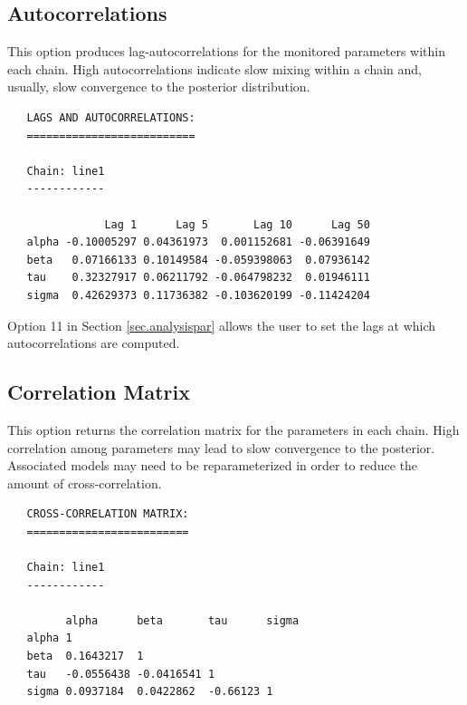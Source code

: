 \documentclass[12pt,letterpaper]{report}
\begin{document}
\subsection{Autocorrelations}
\noindent
This option produces lag-autocorrelations for the monitored parameters within
each chain. High autocorrelations indicate slow mixing within a chain and,
usually, slow convergence to the posterior distribution.
\vskip 9pt
\begin{tiny}
\begin{verbatim}
   LAGS AND AUTOCORRELATIONS:
   ==========================

   Chain: line1
   ------------

               Lag 1      Lag 5       Lag 10      Lag 50
   alpha -0.10005297 0.04361973  0.001152681 -0.06391649
   beta   0.07166133 0.10149584 -0.059398063  0.07936142
   tau    0.32327917 0.06211792 -0.064798232  0.01946111
   sigma  0.42629373 0.11736382 -0.103620199 -0.11424204
\end{verbatim}
\end{tiny}
Option 11 in Section \ref{sec.analysispar} allows the user to set the lags at
which autocorrelations are computed.

\subsection{Correlation Matrix}
\noindent
This option returns the correlation matrix for the parameters in each chain.
High correlation among parameters may lead to slow convergence to the posterior.
Associated models may need to be reparameterized in order to reduce the amount
of cross-correlation.
\vskip 9pt
\begin{tiny}
\begin{verbatim}
   CROSS-CORRELATION MATRIX:
   =========================

   Chain: line1
   ------------

         alpha      beta       tau      sigma
   alpha 1
   beta  0.1643217  1
   tau   -0.0556438 -0.0416541 1
   sigma 0.0937184  0.0422862  -0.66123 1
\end{verbatim}
\end{tiny}
\end{document}
